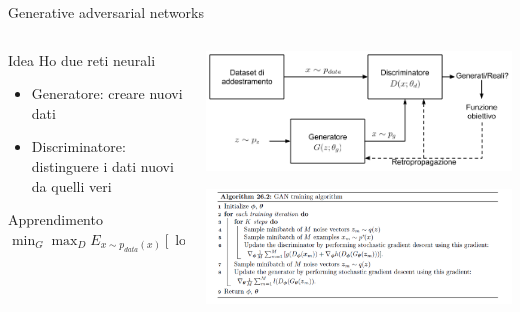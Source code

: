 \documentclass[11pt]{beamer}
\begin{document}
\begin{frame}{Generative adversarial networks \cite{pml1Book,pml2Book}}
\begin{columns}
\begin{column}{0.5\textwidth}
\begin{alertblock}{Idea}
Ho due reti neurali
\begin{itemize}
\item Generatore: creare nuovi dati
\item Discriminatore: distinguere i dati nuovi da quelli veri
\end{itemize}
\end{alertblock}
\begin{alertblock}{Apprendimento}
$\min_{G}\max_{D} E_{x\sim p_{data}(x)} \left[\log D(x)\right]+E_{z\sim p_{z}(z)}\left[\log (1-D(G(z))))\right]$
\end{alertblock}
\end{column}
\begin{column}{0.4\textwidth}  
\begin{center}
\includegraphics[width=\textwidth]{Pic/GAN.png}
\end{center}
\begin{center}
\includegraphics[width=\textwidth]{Pic/algorithm_GAN.png}
\end{center}
\end{column}
\end{columns}
\end{frame}
\end{document}
